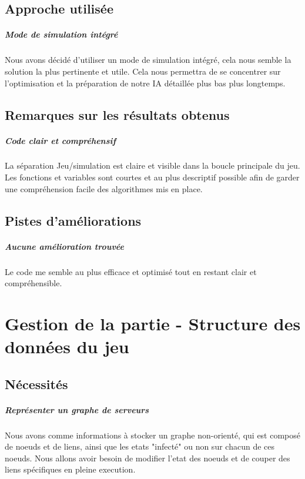 \documentclass{scrreprt}
\begin{document}
    \section{Approche utilisée}
    \paragraph{Mode de simulation intégré}
    Nous avons décidé d'utiliser un mode de simulation intégré, cela nous
    semble la solution la plus pertinente et utile.
    Cela nous permettra de se concentrer sur l'optimisation et la préparation
    de notre IA détaillée plus bas plus longtemps.

    \section{Remarques sur les résultats obtenus}

    \paragraph{Code clair et compréhensif}
    La séparation Jeu/simulation est claire et visible dans la boucle
    principale du jeu.
    Les fonctions et variables sont courtes et au plus descriptif possible
    afin de garder une compréhension facile des algorithmes mis en place.

    \section{Pistes d'améliorations}

    \paragraph{Aucune amélioration trouvée}
    Le code me semble au plus efficace et optimisé tout en restant clair et
    compréhensible.



    \chapter{Gestion de la partie - Structure des données du jeu}

    \section{Nécessités}

    \paragraph{Représenter un graphe de serveurs}
    Nous avons comme informations à stocker un graphe non-orienté, qui est
    composé de noeuds et de liens, ainsi que les etats "infecté" ou non sur
    chacun de ces noeuds.
    Nous allons avoir besoin de modifier l'etat des noeuds et de couper des
    liens spécifiques en pleine execution.
\end{document}
